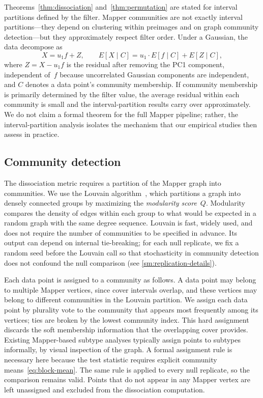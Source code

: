 \documentclass[hidelinks]{siamart251216}
\begin{document}
Theorems~\ref{thm:dissociation} and~\ref{thm:permutation} are stated
for interval partitions defined by the filter.  Mapper communities are
not exactly interval partitions---they depend on clustering within
preimages and on graph community detection---but they approximately
respect filter order.  Under a Gaussian, the data decompose as
\begin{equation}\label{eq:decomposition}
  X = u_1 f + Z, \qquad E[X \mid C] = u_1 \cdot E[f \mid C] + E[Z \mid C],
\end{equation}
where $Z = X - u_1 f$ is the residual after removing the PC1
component, independent of~$f$ because uncorrelated Gaussian
components are independent, and $C$ denotes a data point's community
membership.  If community membership is primarily determined by the
filter value, the average residual within each community is small
and the interval-partition results carry over approximately.  We do
not claim a formal theorem for the full Mapper pipeline; rather, the
interval-partition analysis isolates the mechanism that our empirical
studies then assess in practice.


\subsection{Community detection}\label{sec:community-detection}

The dissociation metric requires a partition of the
Mapper graph into communities.
We use the Louvain algorithm~\citep{Blondel2008}, which
partitions a graph into densely connected groups by maximizing the
\emph{modularity score}~$Q$.  Modularity compares the density of
edges within each group to what would be expected in a random graph with
the same degree sequence.  Louvain is fast, widely used, and does not require the number of
communities to be specified in advance.  Its output can depend on
internal tie-breaking; for each null replicate, we fix a random seed
before the Louvain call so that stochasticity in community detection
does not confound the null comparison (see \cref{sm:replication-details}).

Each data point is assigned to a community as follows. A data point
may belong to multiple Mapper vertices, since cover intervals overlap,
and these vertices may belong to different communities in the
Louvain partition. We assign each data point by plurality vote to the community that
appears most frequently among its vertices; ties
are broken by the lowest community index.  This hard assignment
discards the soft membership information that the overlapping cover
provides.  Existing Mapper-based subtype analyses typically assign
points to subtypes informally, by visual inspection of the graph.
A formal assignment rule is necessary here because the test statistic
requires explicit community means~\eqref{eq:block-mean}.  The same
rule is applied to every null replicate, so the comparison remains
valid.  Points that do not
appear in any Mapper vertex are left unassigned and excluded from the
dissociation computation.
\end{document}
